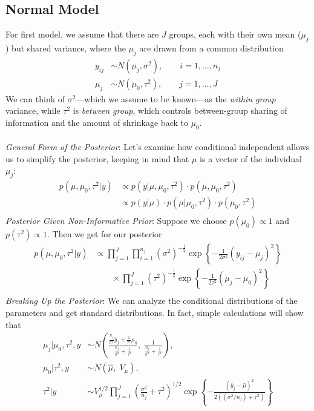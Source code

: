 \documentclass[a4paper,12pt]{scrartcl}
\begin{document}
\newpage
\subsection{Normal Model}

For first model, we assume that there are $J$ groups, each with their
own mean ($\mu_j$) but shared variance, where the $\mu_j$ are drawn
from a common distribution
\begin{align*}
   y_{ij} &\sim N(\mu_j, \sigma^2), \qquad i = 1, \ldots, n_j \\
   \mu_j &\sim N(\mu_0, \tau^2), \qquad j = 1, \ldots, J 
\end{align*}
We can think of $\sigma^2$---which we assume to be known---as the 
\emph{within group} variance, while $\tau^2$ is \emph{between group},
which controls between-group sharing of information
and the amount of shrinkage back to $\mu_0$.
\\
\\
{\sl General Form of the Posterior}: Let's examine how conditional
independent allows us to simplify the posterior, keeping in mind
that $\mu$ is a vector of the individual $\mu_j$:
\begin{align*}
   p(\mu, \mu_0, \tau^2 | y) &\propto p(y | \mu, \mu_0, \tau^2 )\cdot 
      p( \mu, \mu_0, \tau^2 ) \\
   &\propto p(y | \mu ) \cdot p( \mu | \mu_0, \tau^2 ) \cdot
      p( \mu_0, \tau^2 )\\
\end{align*}
{\sl Posterior Given Non-Informative Prior}: Suppose we choose
$p(\mu_0) \propto 1$ and $p(\tau^2) \propto 1$. Then we get for our
posterior 
\begin{align*}
   p(\mu,\mu_0,\tau^2 | y) &\propto \prod^J_{j=1} \prod^{n_j}_{i=1}   
      (\sigma^2)^{-\frac{1}{2}} \exp \left\{ -\frac{1}{2\sigma^2}
      (y_{ij} - \mu_j)^2\right\}  \\ 
      &\qquad \times \prod^J_{j=1} 
      (\tau^2)^{-\frac{1}{2}} \exp\left\{-\frac{1}{2\tau^2}(\mu_j -
      \mu_0)^2\right\} \\
\end{align*}
{\sl Breaking Up the Posterior}: 
We can analyze the conditional distributions of the parameters and
get standard distributions. In fact, simple calculations will show that
\begin{align*}
   \mu_j | \mu_0, \tau^2, y &\sim N\left(\frac{ 
      \frac{n_j}{\sigma^2} \bar{y}_j 
      + \frac{1}{\tau^2}\mu_0}{\frac{n_j}{\sigma^2} + \frac{1}{\tau^2}},
      \; \frac{1}{ \frac{n_j}{\sigma^2} + \frac{1}{\tau^2}} \right), 
      \\
   \mu_0 | \tau^2, y &\sim N\left( \hat{\mu}, 
      \;V_\mu\right),\\
   \tau^2 | y &\sim V^{1/2}_\mu \prod^J_{j=1} \left( 
   \frac{\sigma^2}{n_j} + \tau^2\right)^{1/2} 
   \exp \left\{ -\frac{(\bar{y}_j 
   -\hat{\mu})^2}{2 \left( (\sigma^2/n_j) + \tau^2\right)}
   \right\}
\end{align*}
\end{document}
